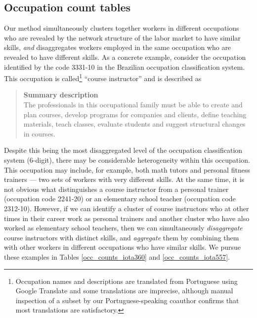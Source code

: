 \documentclass[12pt]{article}
\theoremstyle{definition}
\theoremstyle{plain}
\begin{document}
\subsection{Occupation count tables}
\label{sec:occ_count_tables}

Our method simultaneously clusters together workers in different occupations who are revealed by the network structure of the labor market to have similar skills, \emph{and} disaggregates workers employed in the same occupation who are revealed to have different skills. As a concrete example, consider the occupation identified by the code 3331-10 in the Brazilian occupation classification system. This occupation is called\footnote{Occupation names and descriptions are translated from Portuguese using Google Translate and some translations are imprecise, although manual inspection of a subset by our Portuguese-speaking coauthor confirms that most translations are satisfactory. } ``course instructor'' and is described as 
\begin{quote}
	\textbf{Summary description}\\
	The professionals in this occupational family must be able to create and plan courses, develop programs for companies and clients, define teaching materials, teach classes, evaluate students and suggest structural changes in courses.
\end{quote}
Despite this being the most disaggregated level of the occupation classification system (6-digit), there may be considerable heterogeneity within this occupation. This occupation may include, for example, both math tutors and personal fitness trainers --- two sets of workers with very different skills. At the same time, it is not obvious what distinguishes a  course instructor from a personal trainer (occupation code 2241-20) or an elementary school teacher (occupation code 2312-10). However, if we can identify a cluster of course instructors who at other times in their career work as personal trainers and another cluster who have also worked as elementary school teachers, then we can simultaneously \emph{disaggregate} course instructors with distinct skills, and  \emph{aggregate} them by combining them with other workers in different occupations who have similar skills.  We pursue these examples in Tables \ref{occ_counts_iota360} and \ref{occ_counts_iota557}. 
\end{document}
